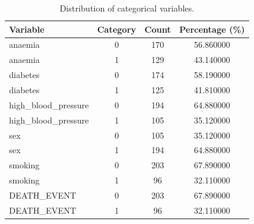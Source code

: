 \begin{table}
\caption{Distribution of categorical variables.}
\label{tab:categorical_stats}
\begin{tabular}{lccc}
\toprule
Variable & Category & Count & Percentage (\%) \\
\midrule
anaemia & 0 & 170 & 56.860000 \\
anaemia & 1 & 129 & 43.140000 \\
diabetes & 0 & 174 & 58.190000 \\
diabetes & 1 & 125 & 41.810000 \\
high_blood_pressure & 0 & 194 & 64.880000 \\
high_blood_pressure & 1 & 105 & 35.120000 \\
sex & 0 & 105 & 35.120000 \\
sex & 1 & 194 & 64.880000 \\
smoking & 0 & 203 & 67.890000 \\
smoking & 1 & 96 & 32.110000 \\
DEATH_EVENT & 0 & 203 & 67.890000 \\
DEATH_EVENT & 1 & 96 & 32.110000 \\
\bottomrule
\end{tabular}
\end{table}
